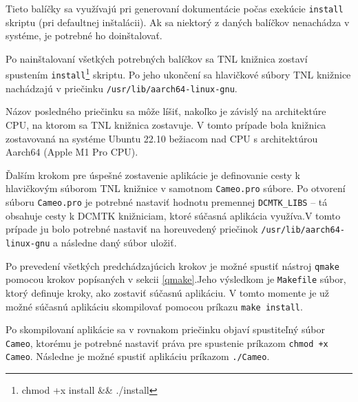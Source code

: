 {Tieto balíčky sa využívajú pri generovaní dokumentácie počas exekúcie \texttt{install} skriptu (pri defaultnej inštalácii). Ak sa niektorý z daných balíčkov nenachádza v systéme, je potrebné ho doinštalovať.

Po nainštalovaní všetkých potrebných balíčkov sa TNL knižnica zostaví spustením \texttt{install}\footnote{chmod +x install \&\& ./install} skriptu. Po jeho ukončení sa hlavičkové súbory TNL knižnice nachádzajú v priečinku \texttt{/usr/lib/aarch64-linux-gnu}.

\clearpage
Názov posledného priečinku sa môže líšiť, nakoľko je závislý na architektúre CPU, na ktorom sa TNL knižnica zostavuje. V tomto prípade bola knižnica zostavovaná na systéme Ubuntu 22.10 bežiacom nad CPU s architektúrou Aarch64 (Apple M1 Pro CPU).

Ďalším krokom pre úspešné zostavenie aplikácie je definovanie cesty k hlavičkovým súborom TNL knižnice v samotnom \texttt{Cameo.pro} súbore. Po otvorení súboru \texttt{Cameo.pro} je potrebné nastaviť hodnotu premennej \lstinline{DCMTK_LIBS} -- tá obsahuje cesty k DCMTK knižniciam, ktoré súčasná aplikácia využíva.\newline V tomto prípade ju bolo potrebné nastaviť na horeuvedený priečinok \newline \texttt{/usr/lib/aarch64-linux-gnu} a následne daný súbor uložiť.

Po prevedení všetkých predchádzajúcich krokov je možné spustiť nástroj \texttt{qmake} pomocou krokov popísaných v sekcii \ref{qmake}.\newline Jeho výsledkom je \texttt{Makefile} súbor, ktorý definuje kroky, ako zostaviť súčasnú aplikáciu. V tomto momente je už možné súčasnú aplikáciu skompilovať pomocou príkazu \texttt{make install}.

Po skompilovaní aplikácie sa v rovnakom priečinku objaví spustiteľný súbor \texttt{Cameo}, ktorému je potrebné nastaviť práva pre spustenie príkazom \texttt{chmod +x Cameo}. Následne je možné spustiť aplikáciu príkazom \texttt{./Cameo}. \clearpage

}
